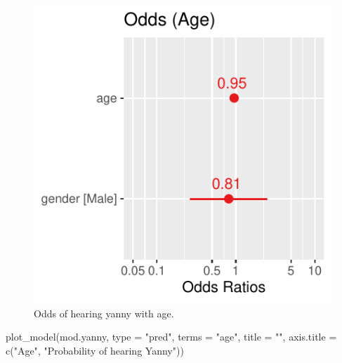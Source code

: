 \documentclass[
  letterpaper,
  DIV=11,
  numbers=noendperiod]{scrartcl}
\newenvironment{Shaded}{\begin{snugshade}}{\end{snugshade}}
\newcommand{\AttributeTok}[1]{\textcolor[rgb]{0.40,0.45,0.13}{#1}}
\newcommand{\FunctionTok}[1]{\textcolor[rgb]{0.28,0.35,0.67}{#1}}
\newcommand{\NormalTok}[1]{\textcolor[rgb]{0.00,0.23,0.31}{#1}}
\newcommand{\StringTok}[1]{\textcolor[rgb]{0.13,0.47,0.30}{#1}}
\begin{document}
\begin{tcolorbox}
\begin{figure}[H]

{\centering \includegraphics{about_files/figure-pdf/unnamed-chunk-7-1.pdf}

}

\caption{Odds of hearing yanny with age.}

\end{figure}%

\begin{Shaded}
\begin{Highlighting}[]
\FunctionTok{plot\_model}\NormalTok{(mod.yanny,}
           \AttributeTok{type =} \StringTok{"pred"}\NormalTok{, }
           \AttributeTok{terms =} \StringTok{"age"}\NormalTok{, }
           \AttributeTok{title =} \StringTok{""}\NormalTok{,}
           \AttributeTok{axis.title =} \FunctionTok{c}\NormalTok{(}\StringTok{"Age"}\NormalTok{, }\StringTok{"Probability of hearing Yanny"}\NormalTok{))}
\end{Highlighting}
\end{Shaded}

\begin{figure}[H]


\end{figure}
\end{tcolorbox}
\end{document}
